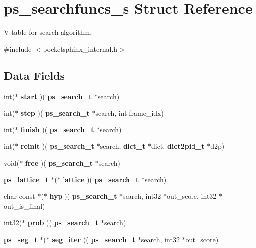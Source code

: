 \section{ps\+\_\+searchfuncs\+\_\+s Struct Reference}
\label{structps__searchfuncs__s}


V-\/table for search algorithm.  




{\ttfamily \#include $<$pocketsphinx\+\_\+internal.\+h$>$}

\subsection*{Data Fields}
\begin{DoxyCompactItemize}
\item 
\mbox{\label{structps__searchfuncs__s_aeba78bc55e0053208a406e5755e328c3}} 
int($\ast$ {\bfseries start} )(\textbf{ ps\+\_\+search\+\_\+t} $\ast$search)
\item 
\mbox{\label{structps__searchfuncs__s_a5e339a33aaa9abce12aad960ccd8ec69}} 
int($\ast$ {\bfseries step} )(\textbf{ ps\+\_\+search\+\_\+t} $\ast$search, int frame\+\_\+idx)
\item 
\mbox{\label{structps__searchfuncs__s_af1b419057d3112ed400b3e8244350298}} 
int($\ast$ {\bfseries finish} )(\textbf{ ps\+\_\+search\+\_\+t} $\ast$search)
\item 
\mbox{\label{structps__searchfuncs__s_a6ac3701ff0654da72bd55e89e4936884}} 
int($\ast$ {\bfseries reinit} )(\textbf{ ps\+\_\+search\+\_\+t} $\ast$search, \textbf{ dict\+\_\+t} $\ast$dict, \textbf{ dict2pid\+\_\+t} $\ast$d2p)
\item 
\mbox{\label{structps__searchfuncs__s_a30c9ebb9036ed7286aba45f3f25abd7e}} 
void($\ast$ {\bfseries free} )(\textbf{ ps\+\_\+search\+\_\+t} $\ast$search)
\item 
\mbox{\label{structps__searchfuncs__s_a94ff0b5cb1ae6660bba5ed3e9886e127}} 
\textbf{ ps\+\_\+lattice\+\_\+t} $\ast$($\ast$ {\bfseries lattice} )(\textbf{ ps\+\_\+search\+\_\+t} $\ast$search)
\item 
\mbox{\label{structps__searchfuncs__s_a74899805519c49115dd55477312bd3a9}} 
char const  $\ast$($\ast$ {\bfseries hyp} )(\textbf{ ps\+\_\+search\+\_\+t} $\ast$search, int32 $\ast$out\+\_\+score, int32 $\ast$out\+\_\+is\+\_\+final)
\item 
\mbox{\label{structps__searchfuncs__s_aa601dc1539edfb40284e94798ba2ab40}} 
int32($\ast$ {\bfseries prob} )(\textbf{ ps\+\_\+search\+\_\+t} $\ast$search)
\item 
\mbox{\label{structps__searchfuncs__s_a7bb9a58892eb6b25f97fac70b05b1f12}} 
\textbf{ ps\+\_\+seg\+\_\+t} $\ast$($\ast$ {\bfseries seg\+\_\+iter} )(\textbf{ ps\+\_\+search\+\_\+t} $\ast$search, int32 $\ast$out\+\_\+score)
\end{DoxyCompactItemize}


